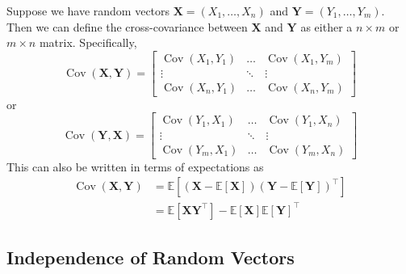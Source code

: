 \documentclass[11pt]{report} %
\begin{document}
Suppose we have random vectors $\mathbf{X} = \left(X_{1}, \dots, X_{n}\right)$ and $\mathbf{Y} = \left(Y_{1}, \dots, Y_{m}\right)$. Then we can define the cross-covariance between $\mathbf{X}$ and $\mathbf{Y}$ as either a $n\times m$ or $m \times n$ matrix. Specifically,
\begin{equation}
\operatorname{Cov}\left(\mathbf{X}, \mathbf{Y}\right) = \begin{bmatrix}\operatorname{Cov}\left(X_{1},Y_{1}\right) & \dots & \operatorname{Cov}\left(X_{1},Y_{m}\right)\\
\vdots & \ddots & \vdots\\
\operatorname{Cov}\left(X_{n},Y_{1}\right) & \dots & \operatorname{Cov}\left(X_{n},Y_{m}\right)
\end{bmatrix}
\end{equation}
or
\begin{equation}
\operatorname{Cov}\left(\mathbf{Y},\mathbf{X}\right)=\begin{bmatrix}\operatorname{Cov}\left(Y_{1},X_{1}\right) & \dots & \operatorname{Cov}\left(Y_{1},X_{n}\right)\\
\vdots & \ddots & \vdots\\
\operatorname{Cov}\left(Y_{m},X_{1}\right) & \dots & \operatorname{Cov}\left(Y_{m},X_{n}\right)
\end{bmatrix}
\end{equation}
This can also be written in terms of expectations as
\begin{align}
\operatorname{Cov}\left(\mathbf{X}, \mathbf{Y}\right) &= \mathbb{E}\left[\left(\mathbf{X} - \mathbb{E}\left[\mathbf{X}\right]\right)\left(\mathbf{Y} - \mathbb{E}\left[\mathbf{Y}\right]\right)^{\top}\right] \\
&= \mathbb{E}\left[\mathbf{X}\mathbf{Y}^{\top}\right] - \mathbb{E}\left[\mathbf{X}\right]\mathbb{E}\left[\mathbf{Y}\right]^{\top}
\end{align}

\subsection{Independence of Random Vectors}
\end{document}
